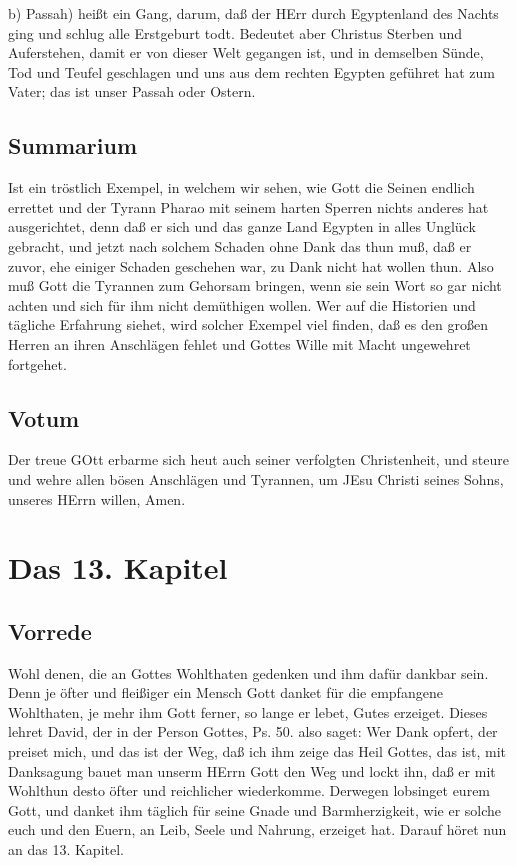 b) Passah) heißt ein Gang, darum, daß der HErr durch Egyptenland des Nachts ging und schlug alle Erstgeburt todt. Bedeutet aber Christus Sterben und Auferstehen, damit er von dieser Welt gegangen ist, und in demselben Sünde, Tod und Teufel geschlagen und uns aus dem rechten Egypten geführet hat zum Vater; das ist unser Passah oder Ostern.

\section{Summarium}

Ist ein tröstlich Exempel, in welchem wir sehen, wie Gott die Seinen endlich errettet und der Tyrann Pharao mit seinem harten Sperren nichts anderes hat ausgerichtet, denn daß er sich und das ganze Land Egypten in alles Unglück gebracht, und jetzt nach solchem Schaden ohne Dank das thun muß, daß er zuvor, ehe einiger Schaden geschehen war, zu Dank nicht hat wollen thun. Also muß Gott die Tyrannen zum Gehorsam bringen, wenn sie sein Wort so gar nicht achten und sich für ihm nicht demüthigen wollen. Wer auf die Historien und tägliche Erfahrung siehet, wird solcher Exempel viel finden, daß es den großen Herren an ihren Anschlägen fehlet und Gottes Wille mit Macht ungewehret fortgehet.

\section{Votum}

Der treue GOtt erbarme sich heut auch seiner verfolgten Christenheit, und steure und wehre allen bösen Anschlägen und Tyrannen, um JEsu Christi seines Sohns, unseres HErrn willen, Amen.

\chapter{Das 13. Kapitel}

\section{Vorrede}

Wohl denen, die an Gottes Wohlthaten gedenken und ihm dafür dankbar sein. Denn je öfter und fleißiger ein Mensch Gott danket für die empfangene Wohlthaten, je mehr ihm Gott ferner, so lange er lebet, Gutes erzeiget. Dieses lehret David, der in der Person Gottes, Ps. 50. also saget: Wer Dank opfert, der preiset mich, und das ist der Weg, daß ich ihm zeige das Heil Gottes, das ist, mit Danksagung bauet man unserm HErrn Gott den Weg und lockt ihn, daß er mit Wohlthun desto öfter und reichlicher wiederkomme. Derwegen lobsinget eurem Gott, und danket ihm täglich für seine Gnade und Barmherzigkeit, wie er solche euch und den Euern, an Leib, Seele und Nahrung, erzeiget hat. Darauf höret nun an das 13. Kapitel.


